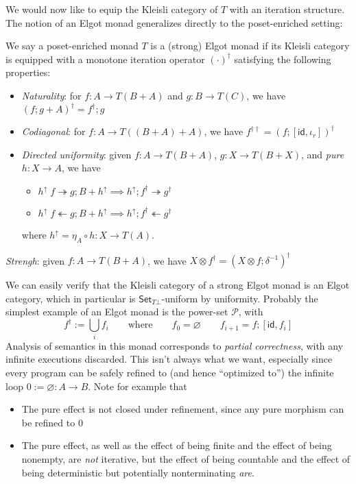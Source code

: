 \documentclass[acmsmall,screen,review]{acmart}
\newcommand{\mc}[1]{\ensuremath{\mathcal{#1}}}
\newcommand{\ms}[1]{\ensuremath{\mathsf{#1}}}
\newcommand{\tref}{\twoheadrightarrow}
\newcommand{\antitref}{\twoheadleftarrow}
\begin{document}
We would now like to equip the Kleisli category of $T$ with an iteration structure. The notion of an
Elgot monad \cite{goncharov-16-complete-elgot} generalizes directly to the poset-enriched setting:
\begin{definition}
  We say a poset-enriched monad $T$ is a (strong) Elgot monad if its Kleisli category is equipped
  with a monotone iteration operator $(\cdot)^\dagger$ satisfying the following properties:
  \begin{itemize}
    \item \emph{Naturality}: for $f : A \to T (B + A)$ and $g : B \to T(C)$, we have $(f ; g +
    A)^\dagger = f^\dagger ; g$
    \item \emph{Codiagonal}: for $f: A \to T ((B + A) + A)$, we have $f^{\dagger\dagger} = (f ;
    [\ms{id}, \iota_r])^\dagger$
    \item \emph{Directed uniformity}: given $f : A \to T(B + A)$, $g: X \to T(B + X)$, and
    \emph{pure} $h : X \to A$, we have
    \begin{itemize}
      \item $h^\uparrow\;f \tref g ; B + h^\uparrow 
        \implies h^\uparrow ; f^\dagger \tref g^\dagger$
      \item$h^\uparrow\;f \antitref g ; B + h^\uparrow 
        \implies h^\uparrow ; f^\dagger \antitref g^\dagger$
    \end{itemize}
    where $h^\uparrow = \eta_A \circ h : X \to T(A)$.
  \end{itemize}
  \item \emph{Strengh}: given $f : A \to T(B + A)$, we have 
  $X \otimes f^\dagger = (X \otimes f ; \delta^{-1})^\dagger$
\end{definition}
We can easily verify that the Kleisli category of a strong Elgot monad is an Elgot category, which
in particular is $\ms{Set}_{T\bot}$-uniform by uniformity. Probably the simplest example of an Elgot
monad is the power-set $\mc{P}$, with
\begin{equation*}
  f^\dagger := \bigcup_i f_i \qquad \text{where} \qquad
  f_0 = \varnothing \qquad f_{i + 1} = f ; [\ms{id}, f_i]
\end{equation*}
Analysis of semantics in this monad corresponds to \emph{partial correctness}, with any infinite
executions discarded. This isn't always what we want, especially since every program can be safely
refined to (and hence ``optimized to'') the infinite loop $0 := \varnothing: A \to B$. Note for
example that
\begin{itemize}
  \item The pure effect is not closed under refinement, since any pure morphism can be refined to
  $0$
  \item The pure effect, as well as the effect of being finite and the effect of being nonempty, are
  \emph{not} iterative, but the effect of being countable and the effect of being deterministic but
  potentially nonterminating \emph{are}.
\end{itemize}
\end{document}
